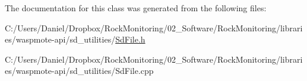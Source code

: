 The documentation for this class was generated from the following files\+:\begin{DoxyCompactItemize}
\item 
C\+:/\+Users/\+Daniel/\+Dropbox/\+Rock\+Monitoring/02\+\_\+\+Software/\+Rock\+Monitoring/libraries/waspmote-\/api/sd\+\_\+utilities/\hyperlink{_sd_file_8h}{Sd\+File.\+h}\item 
C\+:/\+Users/\+Daniel/\+Dropbox/\+Rock\+Monitoring/02\+\_\+\+Software/\+Rock\+Monitoring/libraries/waspmote-\/api/sd\+\_\+utilities/Sd\+File.\+cpp\end{DoxyCompactItemize}
